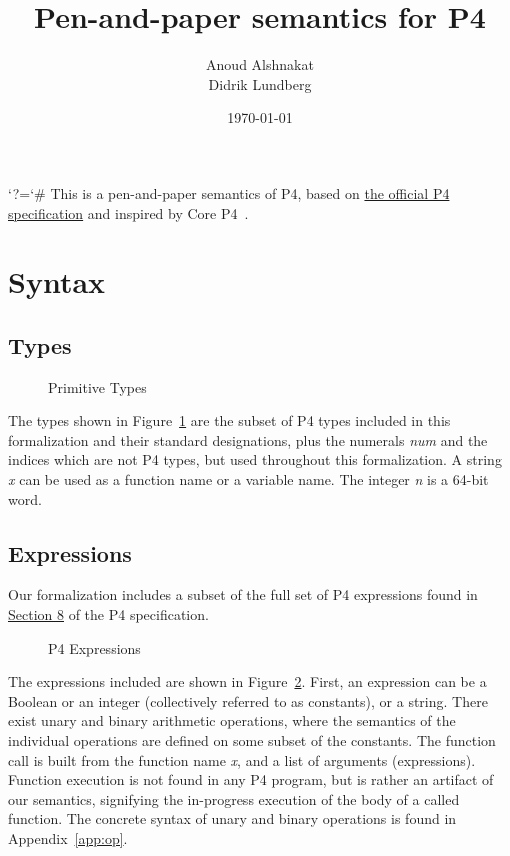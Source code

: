 \documentclass[UTF8]{article}
\title{%
Pen-and-paper semantics for P4}
\author{Anoud Alshnakat\\
Didrik Lundberg
}
\date{\today}
\begin{document}
\maketitle

\begingroup\lccode`?=`# \lowercase{\endgroup
\newcommand{\specsec}[1]{%
    ?#1%
}
}
\newcommand{\pfourspec}[2]{%
\href{https://p4lang.github.io/p4-spec/docs/P4-16-v1.2.2.html\specsec{#1}}{#2}
}
\noindent
This is a pen-and-paper semantics of P4, based on \pfourspec{}{the official P4 specification} and inspired by Core P4~\cite{doenges2021petr4}.

\section{Syntax}
\subsection{Types}
\newcommand{\num}{\textit{num}}
\newcommand{\str}{\textit{x}}
\newcommand{\msg}{\textit{m}}
\newcommand{\inte}{\textit{n}}
%
%
\begin{figure}[h!]
\centering
\ottmetavars
\caption{Primitive Types}
\label{fig:types}
\end{figure}

The types shown in Figure~\ref{fig:types} are the subset of P4 types included in this formalization and their standard designations, plus the numerals \num{} and the indices which are not P4 types, but used throughout this formalization. A string \str{} can be used as a function name or a variable name. The integer \inte{} is a 64-bit word.

\newpage
\subsection{Expressions}
\newcommand{\fmap}{\textit{F}}

Our formalization includes a subset of the full set of P4 expressions found in \pfourspec{sec-exprs}{Section 8} of the P4 specification.

\begin{figure}[h!]
\centering\ottgrammartabular{
\ottexp\ottafterlastrule
}
\caption{P4 Expressions}
\label{fig:exp}
\end{figure}

The expressions included are shown in Figure~\ref{fig:exp}. First, an expression can be a Boolean or an integer (collectively referred to as constants), or a string. There exist unary and binary arithmetic operations, where the semantics of the individual operations are defined on some subset of the constants. The function call is built from the function name \str{}, and a list of arguments (expressions). Function execution is not found in any P4 program, but is rather an artifact of our semantics, signifying the in-progress execution of the body of a called function. The concrete syntax of unary and binary operations is found in Appendix~\ref{app:op}.
\end{document}
